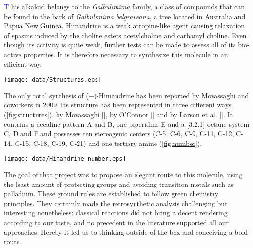 \lettrine[lines=2,loversize=0.1]{\textcolor{Blue}{T}}{ }his alkaloid belongs to the \textit{Galbulimima} family, a class of compounds that can be found in the bark of \textit{Galbulimima belgraveana}, a tree located in Australia and Papua New Guinea. Himandrine is a weak atropine-like agent causing relaxation of spasms induced by the choline esters acetylcholine and carbamyl choline. Even though its activity is quite weak, further tests can be made to assess all of its bio-active properties. It is therefore necessary to synthesize this molecule in an efficient way.\par
\begin{figure''}
\centering
		\texttt{[image: data/Structures.eps]}	
    \label{fig:structures}
\end{figure''}
The only total synthesis of ($-$)-Himandrine has been reported by Movassaghi and coworkers in 2009\autocite{Movassaghi09}. Its structure has been represented in three different ways (\ref{fig:structures}), by Movassaghi [], by O'Connor []\autocite{OConnor10} and by Larson et al. []\autocite{Larson15}. It contains a decaline pattern A and B, one piperidine E and a [3.2.1]-octane system C, D and F and possesses ten stereogenic centers (C-5, C-6, C-9, C-11, C-12, C-14, C-15, C-18, C-19, C-21) and one tertiary amine (\ref{fig:number}).\\
\begin{figure''}
\centering
		\texttt{[image: data/Himandrine\_number.eps]}
    \label{fig:number}
\end{figure''}
The goal of that project was to propose an elegant route to this molecule, using the least amount of protecting groups and avoiding transition metals such as palladium. These ground rules are established to follow green chemistry principles. They certainly made the retrosynthetic analysis challenging but interesting nonetheless: classical reactions did not bring a decent rendering according to our taste, and no precedent in the literature supported all our approaches. Hereby it led us to thinking outside of the box and conceiving a bold route.